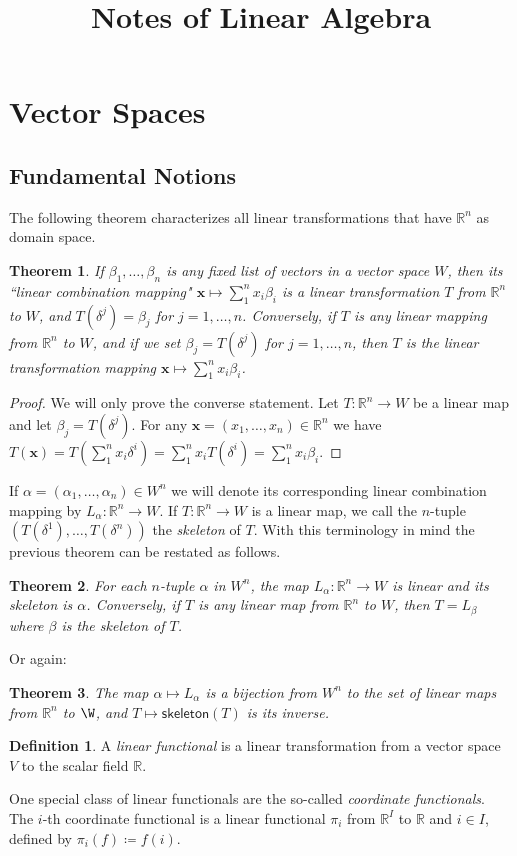 \documentclass[12pt]{article}
\title{Notes of Linear Algebra}
\author{}
\newcommand{\RR}{\mathbb{R}}
\newtheorem{theorem}{Theorem}[section]             \newtheorem{corollary}{Corollary}[theorem]
\theoremstyle{definition}
\newtheorem{definition}{Definition}[section]
\begin{document}
\maketitle
\section{Vector Spaces}
\subsection{Fundamental Notions}
	The following theorem characterizes all linear transformations that have $\RR^n$ as domain space.
	\begin{theorem} 
		If $\beta_1 , \ldots, \beta_n$ is any fixed list of vectors in a vector space $W$, then its ``linear combination mapping" $\mathbf{x} \mapsto \sum_1^n x_i \beta_i$ is a linear transformation $T$ from $\RR^n$ to $W$, and $T(\delta^j) = \beta_j$ for $j = 1, \ldots, n$. Conversely, if $T$ is any linear mapping from $\RR^n$ to $W$, and if we set $\beta_j = T(\delta^j)$ for $j=1, \ldots, n$, then $T$ is the linear transformation mapping $\mathbf{x} \mapsto \sum_1^n x_i \beta_i$.
	\end{theorem}
	\begin{proof}
		We will only prove the converse statement. Let $T : \RR^n \to W$ be a linear map and let $\beta_j = T(\delta^j)$. For any $\mathbf{x} = (x_1, \ldots ,x_n) \in \RR^n$ we have $T(\mathbf{x}) = T(\sum_1^n x_i\delta^i) = \sum_1^n x_i T(\delta^i) = \sum_1^n x_i \beta_i$.
	\end{proof}

	If $\alpha = (\alpha_1, \ldots, \alpha_n) \in W^n$ we will denote its corresponding linear combination mapping by $L_\alpha : \RR^n \to W$. If $T: \RR^n \to W$ is a linear map, we call the $n$-tuple $(T(\delta^1), \ldots, T(\delta^n))$ the \textit{skeleton} of $T$. With this terminology in mind the previous theorem can be restated as follows.
	\begin{theorem}
		For each $n$-tuple $\alpha$ in $W^n$, the map $L_\alpha : \RR^n \to W$ is linear and its skeleton is $\alpha$. Conversely, if $T$ is any linear map from $\RR^n$ to $W$, then $T = L_\beta$ where $\beta$ is the skeleton of $T$.
	\end{theorem}
	Or again:
	\begin{theorem}
		The map $\alpha \mapsto L_\alpha$ is a bijection from $W^n$ to the set of linear maps from $\RR^n$ to $\W$, and $T \mapsto \mathsf{skeleton}(T)$ is its inverse.
	\end{theorem}
	\begin{definition}
		A \textit{linear functional} is a linear transformation from a vector space $V$ to the scalar field $\RR$.
	\end{definition}
	One special class of linear functionals are the so-called \textit{coordinate functionals}. The $i$-th coordinate functional is a linear functional $\pi_i$ from $\RR^I$ to $\RR$ and $i \in I$, defined by $\pi_i(f) \coloneqq f(i)$.
\end{document}
